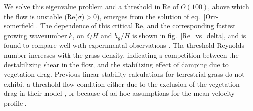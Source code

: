 \documentclass[aps,prl,twocolumn,superscriptaddress,10pt]{revtex4-1}  %
\newcommand{\hg}{h_g}
\newcommand{\Rey}{\text{Re}}
\newcommand{\monami}{\textit{monami }}
\begin{document}

We solve this eigenvalue problem and a threshold in $\Rey$ of $O(100)$, above which the flow is unstable (Re($\sigma$)$>$0), emerges from the 
solution of eq.~\eqref{Orr-somerfield}. The dependence of this critical $\Rey$, and the corresponding fastest growing wavenumber $k$, on $\delta/H$ and $\hg/H$ is shown 
in fig.~\ref{Re_vs_delta}, and is found to compare well with experimental observations \cite{Ghisal02}.
The threshold Reynolds number increases with the grass density, indicating a competition between the 
destabilizing shear in the flow, and the stabilizing effect of damping due to vegetation drag.
Previous linear stability calculations for terrestrial grass do not exhibit a threshold flow condition 
either due to the exclusion of the vegetation drag in their model \cite{Raupach96}, or because of ad-hoc
assumptions for the mean velocity profile \cite{Raupach96,Delangre06}.
\end{document}
